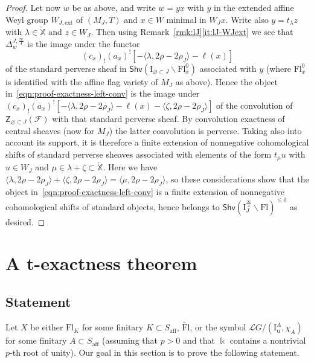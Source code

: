 \documentclass[11pt]{amsart}
\numberwithin{equation}{section}
\theoremstyle{plain}
\theoremstyle{definition}
\newcommand{\sF}{{\mathcal F}}
\newcommand{\I}{{\mathrm I}}
\renewcommand{\k}{\Bbbk}
\newcommand{\sL}{{\mathcal L}}
\newcommand{\X}{{\mathbb X}}
\newcommand{\Xd}{\check{\X}}
\newcommand{\quar}{{{\frac{\infty}{4}}}}
\newcommand{\ex}{\mathrm{ext}}
\newcommand{\af}{\mathrm{aff}}
\newcommand{\Shv}{\mathsf{Shv}}
\newcommand{\Fl}{\mathrm{Fl}}
\newcommand{\tFl}{\widetilde{\Fl}}
\newcommand{\Iu}{\mathrm{I}_{\mathrm{u}}}
\newcommand{\ZCen}{\mathsf{Z}}
\begin{document}
\begin{proof}
Let now $w$ be as above, and write $w=yx$ with $y$ in the extended affine Weyl group $W_{J,\ex}$ of $(M_J,T)$ and $x \in W$ minimal in $W_J x$. Write also $y=t_\lambda z$ with $\lambda \in \Xd$ and $z \in W_J$. 
Then using Remark~\ref{rmk:lJ}\eqref{it:lJ-WJext} we see that $\Delta^{J, \quar}_w$ is the image under the functor
\[
(c_x)_! (a_x)^![- \langle \lambda, 2\rho-2\rho_J \rangle - \ell(x)]
\]
of the standard perverse sheaf in $\Shv(\I_{\varnothing \subset J} \backslash \Fl_x^0)$ associated with $y$ (where $\Fl^0_x$ is identified with the affine flag variety of $M_J$ as above). Hence the object in~\eqref{eqn:proof-exactness-left-conv} is the image under $(c_x)_! (a_x)^![-\langle \lambda, 2\rho-2\rho_J \rangle - \ell(x) -\langle \zeta, 2\rho-2\rho_J \rangle]$ of the convolution of $\ZCen_{\varnothing \subset J}(\sF)$ with that standard perverse sheaf. By convolution exactness of central sheaves (now for $M_J$) the latter convolution is perverse. Taking also into account its support, it is therefore a finite extension of nonnegative cohomological shifts of standard perverse sheaves associated with elements of the form $t_\mu u$ with $u \in W_J$ and $\mu \in \lambda+ \zeta \subset \Xd$. Here we have $\langle \lambda, 2\rho-2\rho_J \rangle + \langle \zeta, 2\rho-2\rho_J \rangle = \langle \mu, 2\rho-2\rho_J \rangle$, so these considerations show that the object in~\eqref{eqn:proof-exactness-left-conv} is a finite extension of nonnegative cohomological shifts of standard objects, hence belongs to $\Shv \left( \I_{J}^\quar \backslash \Fl \right)^{\leq 0}$ as desired.
\end{proof}

\section{A t-exactness theorem} 
\label{sec:t-exactness}

\subsection{Statement} 

Let $X$ be either $\Fl_K$ for some finitary $K \subset S_\af$, $\tFl$, or the symbol $\sL G/(\Iu^A,\chi_A)$ for some finitary $A \subset S_\af$ (assuming that $p>0$ and that $\k$ contains a nontrivial $p$-th root of unity). Our goal in this section is to prove the following statement.
\end{document}
